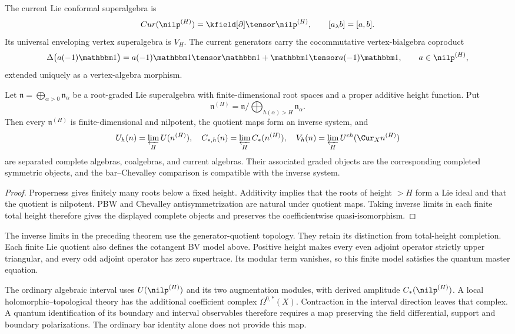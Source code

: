 The current Lie conformal superalgebra is
\[
 \operatorname{Cur}(\nilp^{(H)})=\kfield[\partial]\tensor\nilp^{(H)},
 \qquad [a_\lambda b]=[a,b].
\]
Its universal enveloping vertex superalgebra is $V_H$. The current generators carry the cocommutative vertex-bialgebra coproduct
\[
 \Delta\bigl(a(-1)\mathbbm1\bigr)
 =a(-1)\mathbbm1\tensor\mathbbm1
 +\mathbbm1\tensor a(-1)\mathbbm1,
 \qquad a\in\nilp^{(H)},
\]
extended uniquely as a vertex-algebra morphism.

\begin{theorem}
Let $\mathfrak n=\bigoplus_{\alpha>0}\mathfrak n_\alpha$ be a root-graded Lie superalgebra with finite-dimensional root spaces and a proper additive height function.  Put
\[
 \mathfrak n^{(H)}=\mathfrak n/\!\bigoplus_{h(\alpha)>H}\mathfrak n_\alpha.
\]
Then every $\mathfrak n^{(H)}$ is finite-dimensional and nilpotent, the quotient maps form an inverse system, and
\[
 \widehat U_h(\mathfrak n)=\varprojlim_HU(\mathfrak n^{(H)}),\quad
 \widehat C_{*,h}(\mathfrak n)=\varprojlim_HC_*(\mathfrak n^{(H)}),\quad
 \widehat V_h(\mathfrak n)=\varprojlim_HU^{\ch}(\Cur_X\mathfrak n^{(H)})
\]
are separated complete algebras, coalgebras, and current algebras.  Their associated graded objects are the corresponding completed symmetric objects, and the bar--Chevalley comparison is compatible with the inverse system.
\end{theorem}
\begin{proof}
Properness gives finitely many roots below a fixed height.  Additivity implies that the roots of height $>H$ form a Lie ideal and that the quotient is nilpotent.  PBW and Chevalley antisymmetrization are natural under quotient maps.  Taking inverse limits in each finite total height therefore gives the displayed complete objects and preserves the coefficientwise quasi-isomorphism.
\end{proof}

The inverse limits in the preceding theorem use the generator-quotient topology.
They retain its distinction from total-height completion.
Each finite Lie quotient also defines the cotangent BV model above.
Positive height makes every even adjoint operator strictly upper triangular, and every odd adjoint operator has zero supertrace.
Its modular term vanishes, so this finite model satisfies the quantum master equation.

The ordinary algebraic interval uses $U(\nilp^{(H)})$ and its two augmentation modules, with derived amplitude $C_*(\nilp^{(H)})$.
A local holomorphic--topological theory has the additional coefficient complex $\Omega^{0,*}(X)$.
Contraction in the interval direction leaves that complex.
A quantum identification of its boundary and interval observables therefore requires a map preserving the field differential, support and boundary polarizations.
The ordinary bar identity alone does not provide this map.

